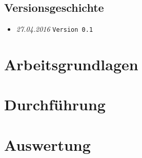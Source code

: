 \documentclass{fhnwreport/fhnwreport}
\begin{document}


\clearpage
\pagestyle{empty}
{
    \renewcommand{\thispagestyle}[1]{}



    \clearpage
    \tableofcontents
    \vspace{5mm}
    \subsection*{Versionsgeschichte}
    \begin{itemize}
        \item[]
            \emph{27.04.2016} \texttt{Version 0.1}
    \end{itemize}
}

\clearpage
\setcounter{page}{1}
\pagestyle{headings}


\clearpage
\section{Arbeitsgrundlagen}
\label{sec:arbeitsgrundlagen}



\clearpage
\section{Durchf\"uhrung}
\label{sec:durchfuehrung}



\clearpage
\section{Auswertung}
\label{sec:auswertung}

\end{document}
